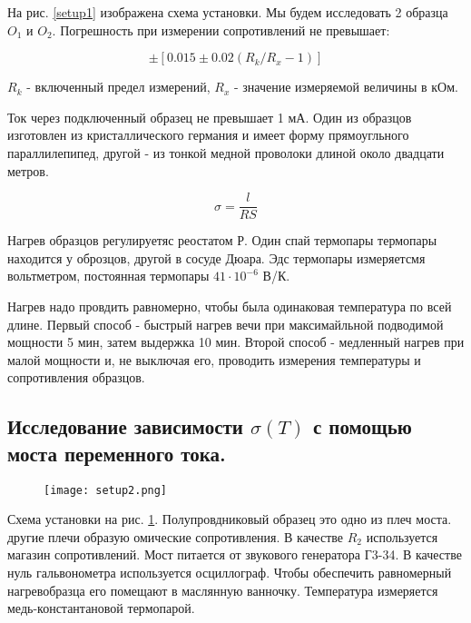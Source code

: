 \documentclass[a4paper]{article}
\begin{document}
На рис. \ref{setup1} изображена схема установки. Мы будем исследовать 2 образца $O_1$ и $O_2$. Погрешность при измерении сопротивлений не превышает:

\begin{equation}
    \pm [0.015 \pm 0.02 (R_k/R_x - 1)]
\end{equation}

$R_k$ - включенный предел измерений, $R_x$ - значение измеряемой величины в кОм. \par 

Ток через подключенный образец не превышает 1 мА. Один из образцов изготовлен из кристаллического германия и имеет форму прямоугльного параллилепипед, другой - из тонкой медной 
проволоки длиной около двадцати метров. 

\begin{equation}
    \sigma = \frac{l}{RS}
\end{equation}

Нагрев образцов регулируетяс реостатом Р. Один спай термопары термопары находится у оброзцов, другой в сосуде Дюара. 
Эдс термопары измеряетсмя вольтметром, постоянная термопары $41 \cdot 10^{-6}$ В/К. \par 

Нагрев надо провдить равномерно, чтобы была одинаковая температура по всей длине. Первый способ - быстрый нагрев вечи при максимайльной подводимой мощности 5 мин, затем выдержка 10 мин. 
Второй способ - медленный нагрев при малой мощности и, не выключая его, проводить измерения температуры и сопротивления образцов. 

\subsection{Исследование зависимости $\sigma(T)$ с помощью моста переменного тока.}

\begin{figure}[H]
    \begin{center}
        \texttt{[image: setup2.png]}
        \caption{}
        \label{setup2}
    \end{center}
\end{figure}

Схема установки на рис. \ref{setup2}. Полупровдниковый образец это одно из плеч моста. другие плечи образую омические сопротивления. 
В качестве $R_2$ используется магазин сопротивлений. Мост питается от звукового генератора Г3-34. В качестве нуль гальвонометра используется осциллограф. 
Чтобы обеспечить равномерный нагревобразца его помещают в маслянную ванночку. Температура измеряется медь-константановой термопарой. 
\end{document}
